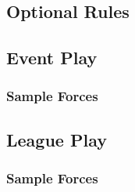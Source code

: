 

\subsection{Optional Rules}



\newpage

\subsection{Event Play}
\label{subsec:force_construction_scale_1}



\newpage

\subsubsection{Sample Forces}
\label{subsec:sample_commands_scale_1}



\newpage

\subsection{League Play}
\label{subsec:force_construction_scale_2}



\newpage

\subsubsection{Sample Forces}
\label{subsec:sample_commands_scale_2}



\newpage

